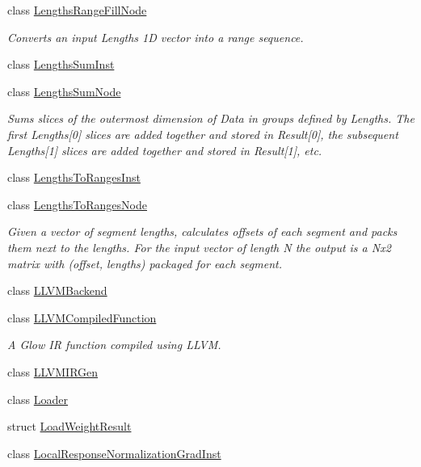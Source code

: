 \begin{DoxyCompactItemize}
class \hyperlink{classglow_1_1_lengths_range_fill_node}{Lengths\+Range\+Fill\+Node}
\begin{DoxyCompactList}\small\item\em Converts an input Lengths 1D vector into a range sequence. \end{DoxyCompactList}\item 
class \hyperlink{classglow_1_1_lengths_sum_inst}{Lengths\+Sum\+Inst}
\item 
class \hyperlink{classglow_1_1_lengths_sum_node}{Lengths\+Sum\+Node}
\begin{DoxyCompactList}\small\item\em Sums slices of the outermost dimension of Data in groups defined by Lengths. The first Lengths\mbox{[}0\mbox{]} slices are added together and stored in Result\mbox{[}0\mbox{]}, the subsequent Lengths\mbox{[}1\mbox{]} slices are added together and stored in Result\mbox{[}1\mbox{]}, etc. \end{DoxyCompactList}\item 
class \hyperlink{classglow_1_1_lengths_to_ranges_inst}{Lengths\+To\+Ranges\+Inst}
\item 
class \hyperlink{classglow_1_1_lengths_to_ranges_node}{Lengths\+To\+Ranges\+Node}
\begin{DoxyCompactList}\small\item\em Given a vector of segment lengths, calculates offsets of each segment and packs them next to the lengths. For the input vector of length N the output is a Nx2 matrix with (offset, lengths) packaged for each segment. \end{DoxyCompactList}\item 
class \hyperlink{classglow_1_1_l_l_v_m_backend}{L\+L\+V\+M\+Backend}
\item 
class \hyperlink{classglow_1_1_l_l_v_m_compiled_function}{L\+L\+V\+M\+Compiled\+Function}
\begin{DoxyCompactList}\small\item\em A Glow IR function compiled using L\+L\+VM. \end{DoxyCompactList}\item 
class \hyperlink{classglow_1_1_l_l_v_m_i_r_gen}{L\+L\+V\+M\+I\+R\+Gen}
\item 
class \hyperlink{classglow_1_1_loader}{Loader}
\item 
struct \hyperlink{structglow_1_1_load_weight_result}{Load\+Weight\+Result}
\item 
class \hyperlink{classglow_1_1_local_response_normalization_grad_inst}{Local\+Response\+Normalization\+Grad\+Inst}

\end{DoxyCompactItemize}
